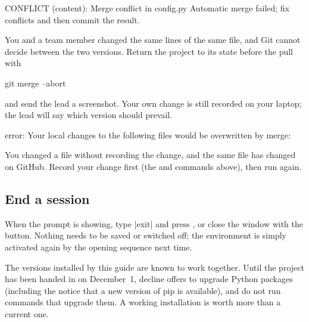 \begin{out}
CONFLICT (content): Merge conflict in config.py
Automatic merge failed; fix conflicts and then commit the result.
\end{out}
You and a team member changed the same lines of the same file, and Git cannot decide between
the two versions. Return the project to its state before the pull with
\begin{ps}
git merge --abort
\end{ps}
and send the lead a screenshot. Your own change is still recorded on your laptop; the lead will
say which version should prevail.

\begin{out}
error: Your local changes to the following files would be overwritten by merge:
\end{out}
You changed a file without recording the change, and the same file has changed on GitHub.
Record your change first (the  and  commands above), then run
 again.

\subsection{End a session}

When the prompt is showing, type \code|exit| and press , or close the window with
the  button. Nothing needs to be saved or switched off; the environment is simply
activated again by the opening sequence next time.

\begin{caution}
The versions installed by this guide are known to work together. Until the project has been
handed in on December~1, decline offers to upgrade Python packages (including the notice that a
new version of pip is available), and do not run commands that upgrade them. A working
installation is worth more than a current one.
\end{caution}

